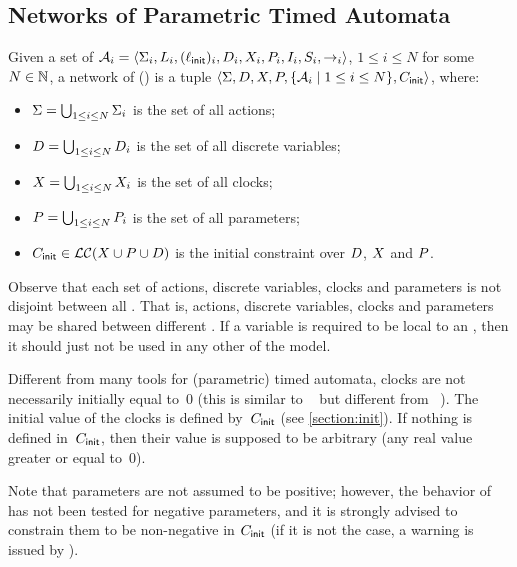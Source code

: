 \subsection{Networks of \imitator{} Parametric Timed Automata}

\begin{definition}[\NIPTA{}]
	Given a set of \IPTA{} $\mathcal{A}_i = \langle\Sigma_i, L_i, (\ell_{\textsf{init}})_i, D_i, X_i, P_i, I_i, S_i, {\rightarrow}_i\rangle$, $1 \leq i \leq N$ for some $N \in {\mathbb N}$,
	a network of \IPTA{} (\emph{\NIPTA{}}) is a tuple
	$\langle\Sigma, D, X, P, \{ \mathcal{A}_i \mid 1 \leq i \leq N \}, C_{\textsf{init}}\rangle$, where:
	\begin{itemize}
		\item $\Sigma = \bigcup_{1 \leq i \leq N} \Sigma_i$ is the set of all actions;
		\item $D = \bigcup_{1 \leq i \leq N} D_i$ is the set of all discrete variables;
		\item $X = \bigcup_{1 \leq i \leq N} X_i$ is the set of all clocks;
		\item $P = \bigcup_{1 \leq i \leq N} P_i$ is the set of all parameters;
		\item $C_{\textsf{init}} \in \mathcal{LC}(X \cup P \cup D)$ is the initial constraint over $D$, $X$ and $P$. %
	\end{itemize}
\end{definition}

Observe that each set of actions, discrete variables, clocks and parameters is not disjoint between all \IPTA{}.
That is, actions, discrete variables, clocks and parameters may be shared between different \IPTA{}.
If a variable is required to be local to an \IPTA{}, then it should just not be used in any other \IPTA{} of the model.

Different from many tools for (parametric) timed automata, clocks are not necessarily initially equal to~0 (this is similar to \hytech{}~\cite{HHW95} but different from \uppaal{}~\cite{LPY97}).
The initial value of the clocks is defined by~$C_{\textsf{init}}$ (see \cref{section:init}).
If nothing is defined in~$C_{\textsf{init}}$, then their value is supposed to be arbitrary (any real value greater or equal to~0).

Note that parameters are not assumed to be positive; however, the behavior of \imitator{} has not been tested for negative parameters, and it is strongly advised to constrain them to be non-negative in $C_{\textsf{init}}$ (if it is not the case, a warning is issued by \imitator{}).

